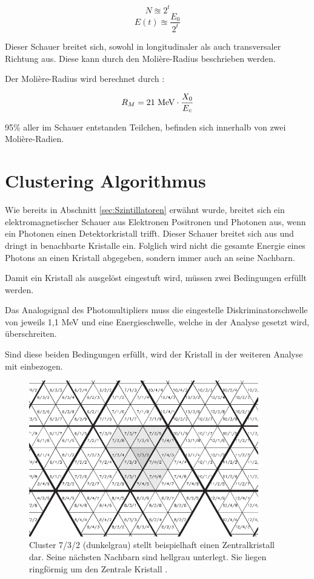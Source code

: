 \documentclass[a4paper,11pt,oneside,final,german,openbib,pdftex]{scrbook}
\begin{document}
{\begin{equation}
N\approxeq 2^t
\end{equation}
\begin{equation}
E(t) \approxeq \frac{E_0}{2^t}
\end{equation}

Dieser Schauer breitet sich, sowohl in longitudinaler als auch transversaler Richtung aus. Diese kann durch den Molière-Radius beschrieben werden. 

Der Molière-Radius wird berechnet durch \cite{Leo87}:

\begin{equation}
R_M = 21 \textnormal{ MeV}\cdot \frac{X_0}{E_c}
\end{equation}

95\% aller im Schauer entstanden Teilchen, befinden sich innerhalb von zwei Molière-Radien. 

\section{Clustering Algorithmus}
\label{sec:Clustering-Algorithmus}

Wie bereits in Abschnitt \ref{sec:Szintillatoren} erw\"ahnt wurde, breitet sich ein elektromagnetischer Schauer aus Elektronen Positronen und Photonen aus, wenn ein Photonen einen Detektorkristall trifft. Dieser Schauer breitet sich aus und dringt in benachbarte Kristalle ein. Folglich wird nicht die gesamte Energie eines Photons an einen Kristall abgegeben, sondern immer auch an seine Nachbarn. 

Damit ein Kristall als ausgel\"ost eingestuft wird, m\"ussen zwei Bedingungen erf\"ullt werden.

Das Analogsignal des Photomultipliers muss die eingestelle Diskriminatorschwelle von jeweils 1,1 MeV und eine Energieschwelle, welche in der Analyse gesetzt wird, \"uberschreiten.

Sind diese beiden Bedingungen erf\"ullt, wird der Kristall in der weiteren Analyse mit einbezogen.

\begin{figure}[h!]
	\begin{center}
		\includegraphics[width=100mm]{ClusterBeispiel}
		\caption[Clusterbildung]{Cluster 7/3/2 (dunkelgrau) stellt beispielhaft einen Zentralkristall dar. Seine n\"achsten Nachbarn sind hellgrau unterlegt. Sie liegen ringf\"ormig um den Zentrale Kristall \cite{Un08}.}
		\label{fig:Cluster-Bildung}	
\end{center}
\end{figure}

}
\end{document}
